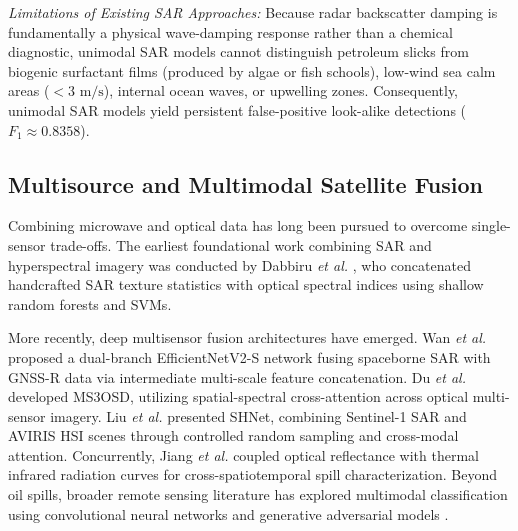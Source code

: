 \documentclass[conference]{IEEEtran}
\begin{document}
\textit{Limitations of Existing SAR Approaches:} Because radar backscatter damping is fundamentally a physical wave-damping response rather than a chemical diagnostic, unimodal SAR models cannot distinguish petroleum slicks from biogenic surfactant films (produced by algae or fish schools), low-wind sea calm areas ($< 3\text{ m/s}$), internal ocean waves, or upwelling zones. Consequently, unimodal SAR models yield persistent false-positive look-alike detections ($F_1 \approx 0.8358$).

\subsection{Multisource and Multimodal Satellite Fusion}
Combining microwave and optical data has long been pursued to overcome single-sensor trade-offs. The earliest foundational work combining SAR and hyperspectral imagery was conducted by Dabbiru \textit{et al.} \cite{dabbiru2015fusion}, who concatenated handcrafted SAR texture statistics with optical spectral indices using shallow random forests and SVMs.

More recently, deep multisensor fusion architectures have emerged. Wan \textit{et al.} \cite{wan2025dualbranch} proposed a dual-branch EfficientNetV2-S network fusing spaceborne SAR with GNSS-R data via intermediate multi-scale feature concatenation. Du \textit{et al.} \cite{du2025ms3osd} developed MS3OSD, utilizing spatial-spectral cross-attention across optical multi-sensor imagery. Liu \textit{et al.} \cite{liu2025shnet} presented SHNet, combining Sentinel-1 SAR and AVIRIS HSI scenes through controlled random sampling and cross-modal attention. Concurrently, Jiang \textit{et al.} \cite{jiang2024cross} coupled optical reflectance with thermal infrared radiation curves for cross-spatiotemporal spill characterization. Beyond oil spills, broader remote sensing literature has explored multimodal classification using convolutional neural networks and generative adversarial models \cite{javali2021sar,sundar2024remoteGAN,thiyagarajan2024landcover}.
\end{document}
